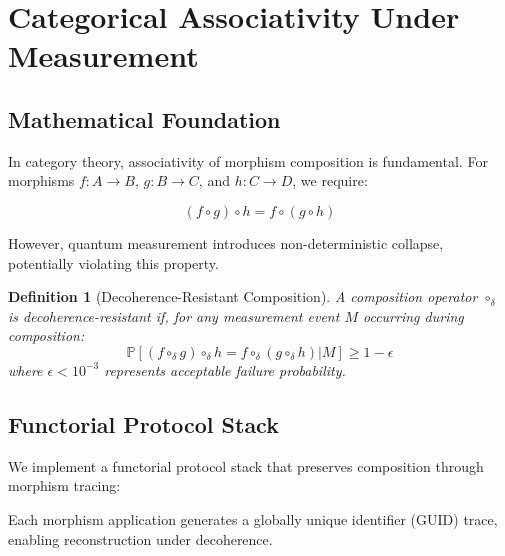 \documentclass[11pt,a4paper]{article}
\newtheorem{definition}[theorem]{Definition}
\newcommand{\compose}{\circ}
\begin{document}
\section{Categorical Associativity Under Measurement}

\subsection{Mathematical Foundation}

In category theory, associativity of morphism composition is fundamental. For morphisms $f: A \to B$, $g: B \to C$, and $h: C \to D$, we require:

\begin{equation}
(f \compose g) \compose h = f \compose (g \compose h)
\label{eq:associativity}
\end{equation}

However, quantum measurement introduces non-deterministic collapse, potentially violating this property.

\begin{definition}[Decoherence-Resistant Composition]
A composition operator $\compose_\delta$ is decoherence-resistant if, for any measurement event $M$ occurring during composition:
\begin{equation}
\mathbb{P}[(f \compose_\delta g) \compose_\delta h = f \compose_\delta (g \compose_\delta h) | M] \geq 1 - \epsilon
\end{equation}
where $\epsilon < 10^{-3}$ represents acceptable failure probability.
\end{definition}

\subsection{Functorial Protocol Stack}

We implement a functorial protocol stack that preserves composition through morphism tracing:

\begin{center}
\end{center}

Each morphism application generates a globally unique identifier (GUID) trace, enabling reconstruction under decoherence.
\end{document}
